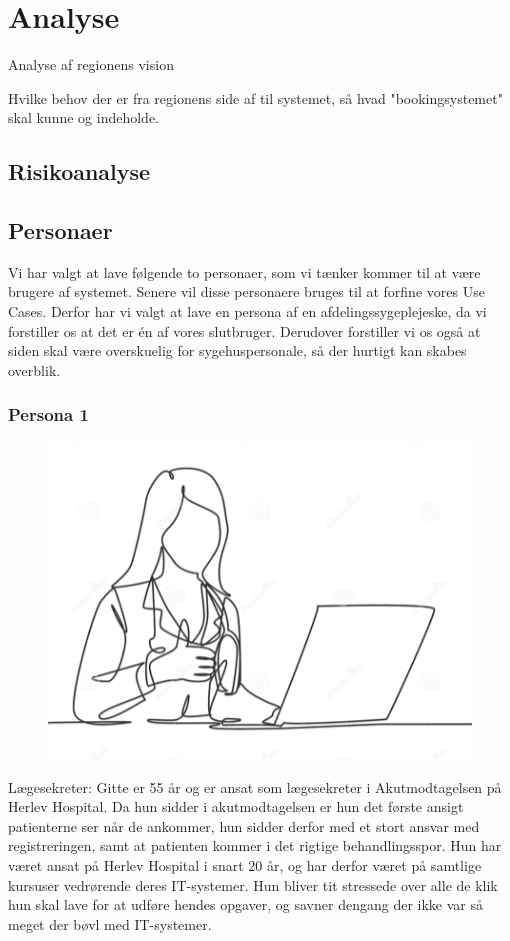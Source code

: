 \section{Analyse}
Analyse af regionens vision

Hvilke behov der er fra regionens side af til systemet, så hvad "bookingsystemet" skal kunne og indeholde.

\subsection{Risikoanalyse}



\subsection{Personaer}
Vi har valgt at lave følgende to personaer, som vi tænker kommer til at være brugere af systemet. 
Senere vil disse personaere bruges til at forfine vores Use Cases. Derfor har vi valgt at lave en persona af en afdelingssygeplejeske, da vi forstiller os at det er én af vores slutbruger. Derudover forstiller vi os også at siden skal være overskuelig for sygehuspersonale, så der hurtigt kan skabes overblik. 


\subsubsection{Persona 1}
\begin{figure}
\includegraphics[width=0.9\linewidth]{Billeder/IT SPL.png} 
\end{figure}
Lægesekreter:
Gitte er 55 år og er ansat som lægesekreter i Akutmodtagelsen på Herlev Hospital. Da hun sidder i akutmodtagelsen er hun det første ansigt patienterne ser når de ankommer, hun sidder derfor med et stort ansvar med registreringen, samt at patienten kommer i det rigtige behandlingsspor. Hun har været ansat på Herlev Hospital i snart 20 år, og har derfor været på samtlige kursuser vedrørende deres IT-systemer. Hun bliver tit stressede over alle de klik hun skal lave for at udføre hendes opgaver, og savner dengang der ikke var så meget der bøvl med IT-systemer. 



